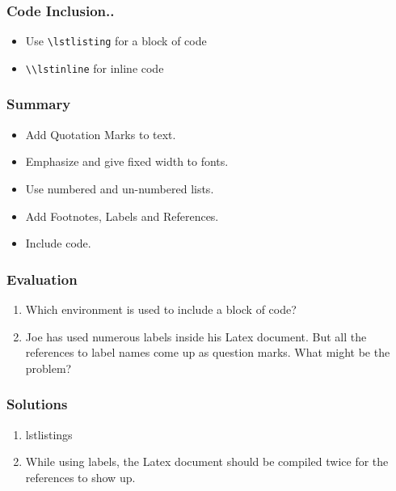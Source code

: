 \documentclass[17pt,compress]{beamer}
\newcommand{\typ}[1]{\lstinline{#1}}
\begin{document}
\begin{frame}[fragile]
  \frametitle{Code Inclusion..}
  \begin{itemize}
  \item Use \lstinline+\lstlisting+ for a block of code
  \item \typ{\\lstinline} for inline code
  \end{itemize}
\end{frame}


\begin{frame}[fragile]
	\frametitle{Summary}
	\begin{itemize}
	\item Add Quotation Marks to text.
	\item Emphasize and give fixed width to fonts.
	\item Use numbered and un-numbered lists.
	\item Add Footnotes, Labels and References.
	\item Include code.
	\end{itemize}
\end{frame}

\begin{frame}[fragile]
\frametitle{Evaluation}
\begin{enumerate}
\item Which environment is used to include a block of code?
\item Joe has used numerous labels inside his Latex document. 
But all the references to label names come up as question marks.
What might be the problem? 
\end{enumerate}
\end{frame}
\begin{frame}

\frametitle{Solutions}
\begin{enumerate}
\item lstlistings
\vspace{15pt}
\item While using labels, the Latex document should be compiled 
twice for the references to show up.
\end{enumerate}
\end{frame}
\end{document}
